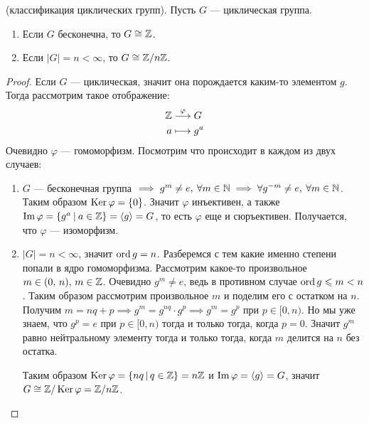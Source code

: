 \documentclass[../main.tex]{subfiles}
\begin{document}
(классификация циклических групп). Пусть $G$ --- циклическая группа.
\begin{enumerate}
  \item Если $G$ бесконечна, то $G \cong \mathbb{Z}$.
  \item Если $|G| = n < \infty$, то $G \cong \mathbb{Z}/n\mathbb{Z}$.
\end{enumerate}
\begin{proof}
  Если $G$ --- циклическая, значит она порождается каким-то элементом $g$. Тогда рассмотрим такое отображение:
  \begin{align*}
    \mathbb{Z} &\overset{\varphi}{\longrightarrow} G \\
    a &\longmapsto g^a
  \end{align*}
  Очевидно $\varphi$ --- гомоморфизм. Посмотрим что происходит в каждом из двух случаев:
  \begin{enumerate}
    \item $G$ --- бесконечная группа $\implies g^m \neq e, \: \forall m \in \mathbb{N}
    \implies \forall g^{-m} \ne e, \: \forall m \in \mathbb{N}$. Таким образом $\operatorname{Ker} \varphi = \{0\}$. Значит $\varphi$ инъективен, а также $\operatorname{Im} \varphi = \{g^a \: | \: a \in \mathbb{Z}\} = \left\langle g \right\rangle = G$, то есть $\varphi$ еще и сюръективен. Получается, что $\varphi$ --- изоморфизм.

    \item $|G| = n < \infty$, значит $\operatorname{ord} g = n$. Разберемся с тем какие именно степени попали в ядро гомоморфизма. Рассмотрим какое-то произвольное $m \in (0,\, n), \, m \in \mathbb{Z}$. Очевидно $g^m \neq e$, ведь в противном случае $\operatorname{ord} g \leqslant m < n$. Таким образом рассмотрим произвольное $m$ и поделим его с остатком на $n$. Получим $m = nq + p \implies g^m = g^{nq}\cdot g^p \implies g^m = g^p$ при $p \in [0, n)$. Но мы уже знаем, что $g^p = e$ при $p \in [0, n)$ тогда и только тогда, когда $p = 0$. Значит $g^m$ равно нейтральному элементу тогда и только тогда, когда $m$ делится на $n$ без остатка.

    Таким образом $\operatorname{Ker} \varphi = \{nq \, | \, q \in \mathbb{Z}\} = n\mathbb{Z}$ и $\operatorname{Im} \varphi = \left\langle g \right\rangle = G$, значит $G \cong \mathbb{Z}/\operatorname{Ker} \varphi = \mathbb{Z}/n\mathbb{Z}$.
  \end{enumerate}
\end{proof}
\end{document}
